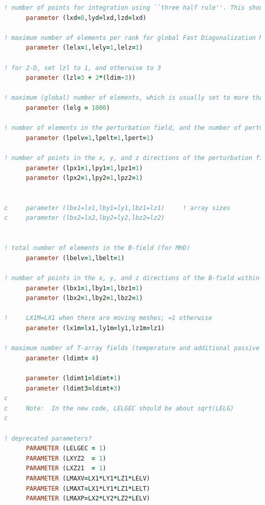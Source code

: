 \documentclass[10pt]{article}
\numberwithin{equation}{section} %
\begin{document}
\begin{itemize}
\begin{lstlisting}[language=Fortran]
! number of points for integration using ``three half rule''. This should typically be set to lxd=1.5*lx1. On some platforms, however, you should set lxd to an even number. You should try to minimize this polynomial order used for the fine grid.
      parameter (lxd=8,lyd=lxd,lzd=lxd)

! maximum number of elements per rank for global Fast Diagonalization Method solver
      parameter (lelx=1,lely=1,lelz=1)

! for 2-D, set lzl to 1, and otherwise to 3
      parameter (lzl=3 + 2*(ldim-3))

! maximum (global) number of elements, which is usually set to more than the number of elements in the mesh. This can be set to the exact number of elements for best memory usage. 
      parameter (lelg = 1000)

! number of elements in the perturbation field, and the number of perturbation fields
      parameter (lpelv=1,lpelt=1,lpert=1)
   
! number of points in the x, y, and z directions of the perturbation field within each element of mesh 1 and mesh 2   
      parameter (lpx1=1,lpy1=1,lpz1=1)
      parameter (lpx2=1,lpy2=1,lpz2=1)


c     parameter (lbx1=lx1,lby1=ly1,lbz1=lz1)     ! array sizes
c     parameter (lbx2=lx2,lby2=ly2,lbz2=lz2)


! total number of elements in the B-field (for MHD)
      parameter (lbelv=1,lbelt=1)

! number of points in the x, y, and z directions of the B-field within each element of mesh 1 and mesh 2
      parameter (lbx1=1,lby1=1,lbz1=1)
      parameter (lbx2=1,lby2=1,lbz2=1)

!     LX1M=LX1 when there are moving meshes; =1 otherwise
      parameter (lx1m=lx1,ly1m=ly1,lz1m=lz1)

! maximum number of T-array fields (temperature and additional passive scalars)
      parameter (ldimt= 4)    

      parameter (ldimt1=ldimt+1)
      parameter (ldimt3=ldimt+3)
c
c     Note:  In the new code, LELGEC should be about sqrt(LELG)
c

! deprecated parameters?
      PARAMETER (LELGEC = 1)
      PARAMETER (LXYZ2  = 1)
      PARAMETER (LXZ21  = 1)
      PARAMETER (LMAXV=LX1*LY1*LZ1*LELV)
      PARAMETER (LMAXT=LX1*LY1*LZ1*LELT)
      PARAMETER (LMAXP=LX2*LY2*LZ2*LELV)


\end{lstlisting}
\end{itemize}
\end{document}
